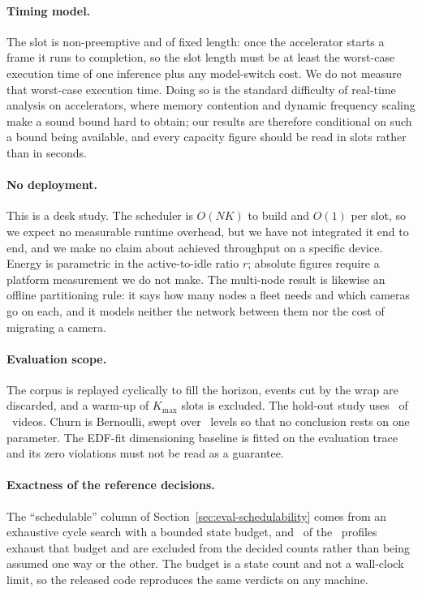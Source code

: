\documentclass[final,5p,times,twocolumn]{elsarticle}
\theoremstyle{definition}
\newcommand{\Nc}{N}
\begin{document}
\paragraph{Timing model.} The slot is non-preemptive and of fixed length: once the accelerator
starts a frame it runs to completion, so the slot length must be at least the worst-case
execution time of one inference plus any model-switch cost. We do not measure that worst-case
execution time. Doing so is the standard difficulty of real-time analysis on accelerators, where
memory contention and dynamic frequency scaling make a sound bound hard to obtain; our results
are therefore conditional on such a bound being available, and every capacity figure should be
read in slots rather than in seconds.

\paragraph{No deployment.} This is a desk study. The scheduler is $O(\Nc K)$ to build and $O(1)$
per slot, so we expect no measurable runtime overhead, but we have not integrated it end to end,
and we make no claim about achieved throughput on a specific device. Energy is parametric in the
active-to-idle ratio $r$; absolute figures require a platform measurement we do not make. The
multi-node result is likewise an offline partitioning rule: it says how many nodes a fleet needs
and which cameras go on each, and it models neither the network between them nor the cost of
migrating a camera.

\paragraph{Evaluation scope.} The corpus is replayed cyclically to fill the horizon, events cut by
the wrap are discarded, and a warm-up of $K_{\max}$ slots is excluded. The hold-out study uses
\numHoldoutVideos\ of \numHoldoutTotal\ videos. Churn is Bernoulli, swept over
\numEfiveLamLevels\ levels so that no conclusion rests on one parameter. The EDF-fit dimensioning
baseline is fitted on the evaluation trace and its zero violations must not be read as a
guarantee.

\paragraph{Exactness of the reference decisions.} The ``schedulable'' column of
Section~\ref{sec:eval-schedulability} comes from an exhaustive cycle search with a bounded state
budget, and \numEoneUndecided\ of the \numEoneInstances\ profiles exhaust that budget and are
excluded from the decided counts rather than being assumed one way or the other. The budget is a
state count and not a wall-clock limit, so the released code reproduces the same verdicts on any
machine.
\end{document}
